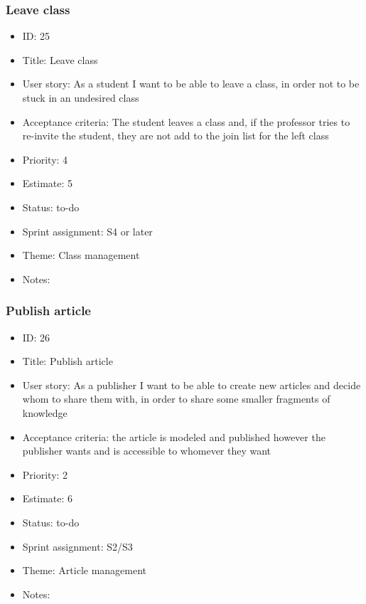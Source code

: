 \subsubsection{Leave class}
\begin{itemize}
	\item ID: 25
	\item Title: Leave class
	\item User story: As a student I want to be able to leave a class, in order not to be stuck in an undesired class
	\item Acceptance criteria: The student leaves a class and, if the professor tries to re-invite the student, they are not add to the join list for the left class
	\item Priority: 4
	\item Estimate: 5
	\item Status: to-do
	\item Sprint assignment: S4 or later
	\item Theme: Class management
	\item Notes:
\end{itemize}

\subsubsection{Publish article}
\begin{itemize}
	\item ID: 26
	\item Title: Publish article
	\item User story: As a publisher I want to be able to create new articles and decide whom to share them with, in order to share some smaller fragments of knowledge
	\item Acceptance criteria: the article is modeled and published however the publisher wants and is accessible to whomever they want
	\item Priority: 2
	\item Estimate: 6
	\item Status: to-do
	\item Sprint assignment: S2/S3
	\item Theme: Article management
	\item Notes:
\end{itemize}

